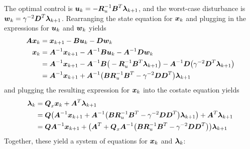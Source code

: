 The optimal control is $\vb*{u}_{k} = -\vb*{R}_{u}^{-1} \vb*{B}^{T} \vb*{\lambda}_{k+1}$, and the worst-case disturbance is $\vb*{w}_{k} = \gamma^{-2} \vb*{D}^{T} \vb*{\lambda}_{k+1}$.  Rearranging the state equation for $\vb*{x}_{k}$ and plugging in the expressions for $\vb*{u}_{k}$ and $\vb*{w}_{k}$ yields
\begin{equation}
\begin{aligned}
	\vb*{A}\vb*{x}_{k} &= \vb*{x}_{k+1} - \vb*{B}\vb*{u}_{k} - \vb*{D}\vb*{w}_{k}\\
	\vb*{x}_{k} &= \vb*{A}^{-1}\vb*{x}_{k+1} - \vb*{A}^{-1}\vb*{B}\vb*{u}_{k}
		- \vb*{A}^{-1}\vb*{D}\vb*{w}_{k}\\
	&= \vb*{A}^{-1}\vb*{x}_{k+1} - \vb*{A}^{-1} \vb*{B} \big{(}-\vb*{R}_{u}^{-1}
		\vb*{B}^{T} \vb*{\lambda}_{k+1} \big{)} - \vb*{A}^{-1}\vb*{D} \big{(}
			\gamma^{-2} \vb*{D}^{T} \vb*{\lambda}_{k+1} \big{)}\\
	&= \vb*{A}^{-1}\vb*{x}_{k+1} + \vb*{A}^{-1} \big{(} \vb*{B} \vb*{R}_{u}^{-1} \vb*{B}^{T}
		- \gamma^{-2} \vb*{D}\vb*{D}^{T} \big{)} \vb*{\lambda}_{k+1}
\end{aligned}
\end{equation}
and plugging the resulting expression for $\vb*{x}_{k}$ into the costate equation yields
\begin{equation}
\begin{aligned}
	\vb*{\lambda}_{k} &= \vb*{Q}_{x}\vb*{x}_{k} + \vb*{A}^{T}\vb*{\lambda}_{k+1}\\
	&= \vb*{Q} \big{(} \vb*{A}^{-1}\vb*{x}_{k+1} + \vb*{A}^{-1} \big{(}
			\vb*{B} \vb*{R}_{u}^{-1} \vb*{B}^{T} - \gamma^{-2} \vb*{D}\vb*{D}^{T}
			\big{)} \vb*{\lambda}_{k+1} \big{)} + \vb*{A}^{T}\vb*{\lambda}_{k+1}\\
	&= \vb*{Q} \vb*{A}^{-1}\vb*{x}_{k+1} + \big{(} \vb*{A}^{T} +\vb*{Q}_{x}\vb*{A}^{-1}
			\big{(} \vb*{B} \vb*{R}_{u}^{-1} \vb*{B}^{T} - \gamma^{-2} \vb*{D}\vb*{D}^{T} \big{)}
			\big{)} \vb*{\lambda}_{k+1}\\
\end{aligned}
\end{equation}
Together, these yield a system of equations for $\vb*{x}_{k}$ and $\vb*{\lambda}_{k}$:
